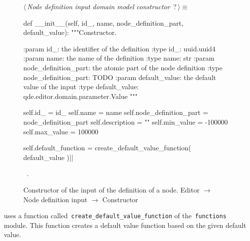 \documentclass[%
    a4paper,    %
    justified,  %
    nobib,      %
    openany     %
]{tufte-book}
\makeatletter
\renewcommand{\label}[1]{\@tufte@label{##1}}%
\makeatother
\begin{document}
\begin{figure}
\begin{flushleft} \small
\begin{minipage}{\linewidth}\label{scrap135}\raggedright\small
{} $\langle\,${\itshape Node definition input domain model constructor}\nobreak\ {\footnotesize {?}}$\,\rangle\equiv$
\vspace{-1ex}
\begin{pythoncode}
def __init__(self, id_, name, node_definition_part, default_value):
    """Constructor.

    :param id_: the identifier of the definition
    :type  id_: uuid.uuid4
    :param name: the name of the definition
    :type  name: str
    :param node_definition_part: the atomic part of the node definition
    :type node_definition_part: TODO
    :param default_value: the default value of the input
    :type default_value: qde.editor.domain.parameter.Value
    """

    self.id_                  = id_
    self.name                 = name
    self.node_definition_part = node_definition_part
    self.description          = ""
    self.min_value            = -100000
    self.max_value            = 100000

    self.default_function = create_default_value_function(
        default_value
    )|\NWsep|
\end{pythoncode}
\vspace{1.5ex}
\footnotesize
\begin{list}{}{\setlength{\itemsep}{-\parsep}\setlength{\itemindent}{-\leftmargin}}
\item \NWtxtMacroRefIn\ .

\item{}
\end{list}
\end{minipage}\vspace{4ex}
\end{flushleft}
\caption{Constructor of the input of the definition of a node.
  \newline{}\newline{}Editor $\rightarrow$ Node definition input $\rightarrow$
  Constructor}
\label{editor:lst:node-definition-input:constructor}
\end{figure}

 uses a function called~\verb=create_default_value_function= of
the~\verb=functions= module. This function creates a default value function
based on the given default value.
\end{document}
